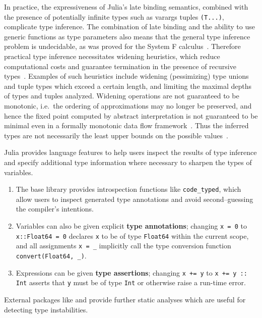 \documentclass[pldi]{sigplanconf-pldi15}
\begin{document}
In practice, the expressiveness of Julia's late binding semantics, combined
with the presence of potentially infinite types such as varargs tuples
\verb|(T...)|, complicate type inference. The combination of late binding and
the ability to use generic functions as type parameters also means that the
general type inference problem is undecidable, as was proved for the System F
calculus~\cite{Wells1999}. Therefore practical type inference necessitates
widening heuristics, which reduce computational costs and guarantee termination
in the presence of recursive types~\cite{Cousot1992a}. Examples of such
heuristics include widening (pessimizing) type unions and tuple types which
exceed a certain length, and limiting the maximal depths of types
and tuples analyzed. Widening operations are not guaranteed to be monotonic,
i.e.\ the ordering of approximations may no longer be preserved, and hence the
fixed point computed by abstract interpretation is not guaranteed to be
minimal even in a formally monotonic data flow framework~\cite{Cousot1992}.
Thus the inferred types are not necessarily the least upper bounds on the
possible values~\cite{Kaplan1977,Kaplan1980}.

Julia provides language features to help users inspect the results of type
inference and specify additional type information where necessary to sharpen
the types of variables.

\begin{enumerate}

	\item The base library provides introspection functions like
	\verb|code_typed|, which allow users to inspect generated type
	annotations and avoid second--guessing the compiler's intentions.
		
	\item Variables can also be given explicit \textbf{type annotations};
	changing \verb|x = 0| to \verb|x::Float64 = 0| declares \verb|x| to be
	of type \verb|Float64| within the current scope, and all assignments
	\verb|x = _| implicitly call the type conversion function
	\verb|convert(Float64, _)|.

	\item Expressions can be given \textbf{type assertions}; changing
	\verb|x += y| to \verb|x += y :: Int| asserts that \verb|y| must be of
	type \verb|Int| or otherwise raise a run-time error.

\end{enumerate}
%
External packages like  and  provide
further static analyses which are useful for detecting type instabilities.
\end{document}
